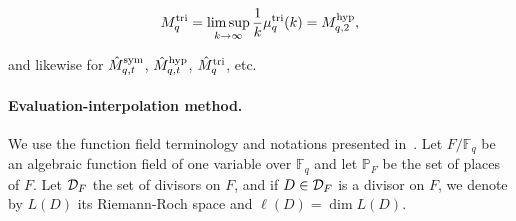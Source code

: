 \documentclass[11pt]{article}
\begin{document}
\[ M^{\textrm{tri}}_q=\limsup_{k\to\infty}\frac{1}{k}\mu^{\textrm{tri}}_q(k)=M^{\textrm{hyp}}_{q,2}, \]
\vspace{-.5\baselineskip}

\noindent and likewise for $\hat{M}^{\textrm{sym}}_{q,t}$, $\hat{M}^{\textrm{hyp}}_{q,t}$, $\hat{M}^{\textrm{tri}}_q$, etc.


\paragraph{Evaluation-interpolation method.}
We use the function field terminology and notations
presented in~\cite{Stichtenoth09}. Let $F/\mathbb{F}_q$ be an algebraic
function field of one variable over $\mathbb{F}_{q}$ and let $\mathbb{P}_F$ be the
set of places of $F$. Let $\mathcal{D}_F$ the set of
divisors on $F$, and if $D\in\mathcal{D}_F$ is a divisor on
$F$, we denote by $L(D)$ its Riemann-Roch space and $\ell(D)=\dim L(D)$.
\end{document}
